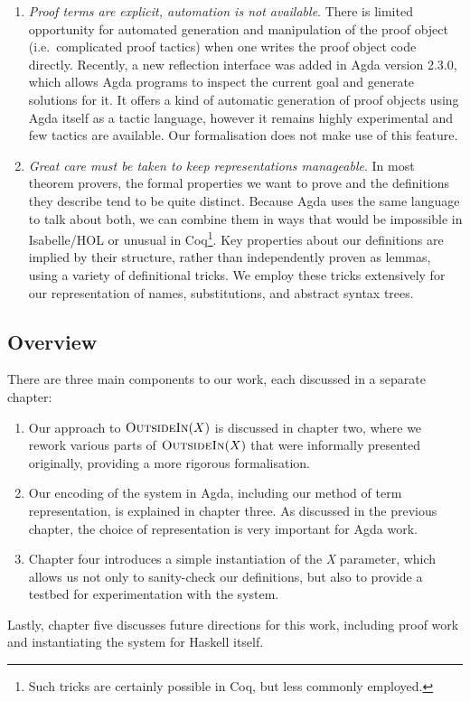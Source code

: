 \documentclass[a4paper]{jfp}
\newcommand{\outsidein}{\textsc{OutsideIn}(X)}
\begin{document}
\begin{enumerate}
   \item \emph{Proof terms are explicit, automation is not available}. There is limited opportunity for automated generation and manipulation of the
      proof object (i.e.\ complicated proof tactics) when one writes the proof object code directly. Recently, a new reflection interface was added in
      Agda version 2.3.0, which allows Agda programs to inspect the current goal and generate solutions for it. It offers a kind of automatic
      generation of proof objects using Agda itself as a tactic language, however it remains highly experimental and few tactics are available. Our
      formalisation does not make use of this feature.

   \item \emph{Great care must be taken to keep representations manageable}. In most theorem provers, the formal properties we want to prove and the
      definitions they describe tend to be quite distinct. Because Agda uses the same language to talk about both, we can combine them in ways that
      would be impossible in Isabelle/HOL or unusual in Coq\footnote{Such tricks are certainly possible in Coq, but less commonly employed.}. Key
      properties about our definitions are implied by their structure, rather than independently proven as lemmas, using a variety of definitional
      tricks. We employ these tricks extensively for our representation of names, substitutions, and abstract syntax trees. 

\end{enumerate}

\pagebreak

\subsection{Overview}

There are three main components to our work, each discussed in a separate chapter:
\begin{enumerate}
      \item Our approach to $\outsidein$ is discussed in chapter two, where we rework various parts of $\outsidein$ that were informally presented originally,
providing a more rigorous formalisation. 
      \item Our encoding of the system in Agda, including our method of term representation, is explained in chapter three. As discussed in the
         previous chapter, the choice of representation is very important for Agda work.
      \item Chapter four introduces a simple instantiation of the \emph{X} parameter, which allows us not only to sanity-check our definitions, but also to
         provide a testbed for experimentation with the system. 
   \end{enumerate}         
Lastly, chapter five discusses future directions for this work, including proof work and instantiating the system for Haskell itself.
\end{document}
